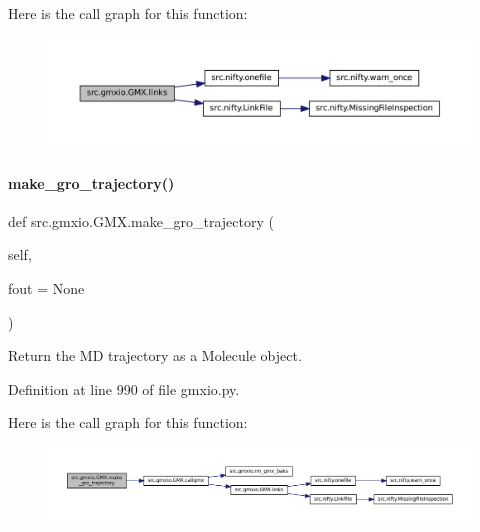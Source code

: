 Here is the call graph for this function\+:
\nopagebreak
\begin{figure}[H]
\begin{center}
\leavevmode
\includegraphics[width=350pt]{classsrc_1_1gmxio_1_1GMX_a3f0267ba817464cc778e6fe4a50e8440_cgraph}
\end{center}
\end{figure}
\mbox{\label{classsrc_1_1gmxio_1_1GMX_a359787564e21019ed5baa7e436f0e523}} 
\paragraph{\texorpdfstring{make\+\_\+gro\+\_\+trajectory()}{make\_gro\_trajectory()}}
{\footnotesize\ttfamily def src.\+gmxio.\+G\+M\+X.\+make\+\_\+gro\+\_\+trajectory (\begin{DoxyParamCaption}\item[{}]{self,  }\item[{}]{fout = {\ttfamily None} }\end{DoxyParamCaption})}



Return the MD trajectory as a Molecule object. 



Definition at line 990 of file gmxio.\+py.

Here is the call graph for this function\+:
\nopagebreak
\begin{figure}[H]
\begin{center}
\leavevmode
\includegraphics[width=350pt]{classsrc_1_1gmxio_1_1GMX_a359787564e21019ed5baa7e436f0e523_cgraph}
\end{center}
\end{figure}
\mbox{\label{classsrc_1_1gmxio_1_1GMX_a3133906ca908cb9a5e6fc816460ec498}} 
